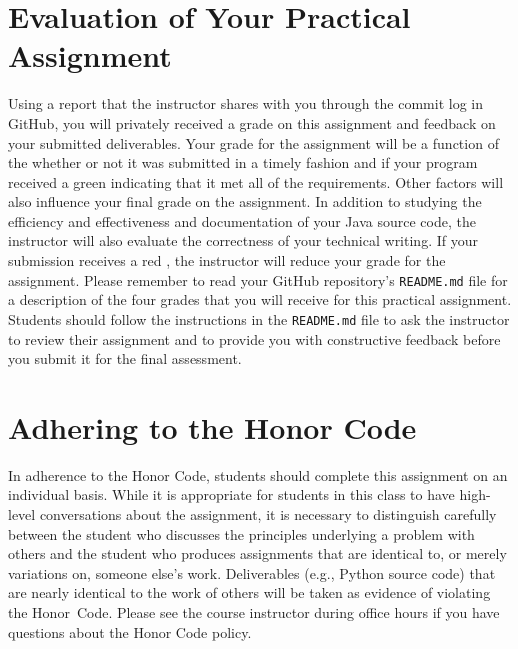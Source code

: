 \documentclass[11pt]{article}
\newcommand{\program}[1]{\lstinline{#1}}
\newcommand{\checkmark}{\ding{51}}
\newcommand{\naughtmark}{\ding{55}}
\begin{document}
\section*{Evaluation of Your Practical Assignment}

Using a report that the instructor shares with you through the commit log in
GitHub, you will privately received a grade on this assignment and feedback on
your submitted deliverables. Your grade for the assignment will be a function of
the whether or not it was submitted in a timely fashion and if your program
received a green \checkmark{} indicating that it met all of the requirements.
Other factors will also influence your final grade on the assignment. In
addition to studying the efficiency and effectiveness and documentation of your
Java source code, the instructor will also evaluate the correctness of your
technical writing. If your submission receives a red \naughtmark{}, the
instructor will reduce your grade for the assignment. Please remember to read
your GitHub repository's \program{README.md} file for a description of the four
grades that you will receive for this practical assignment. Students should
follow the instructions in the \program{README.md} file to ask the instructor to
review their assignment and to provide you with constructive feedback before you
submit it for the final assessment.

\section*{Adhering to the Honor Code}

In adherence to the Honor Code, students should complete this assignment on an
individual basis. While it is appropriate for students in this class to have
high-level conversations about the assignment, it is necessary to distinguish
carefully between the student who discusses the principles underlying a problem
with others and the student who produces assignments that are identical to, or
merely variations on, someone else's work. Deliverables (e.g., Python source
code) that are nearly identical to the work of others will be taken as evidence
of violating the \mbox{Honor Code}. Please see the course instructor during
office hours if you have questions about the Honor Code policy.
\end{document}
